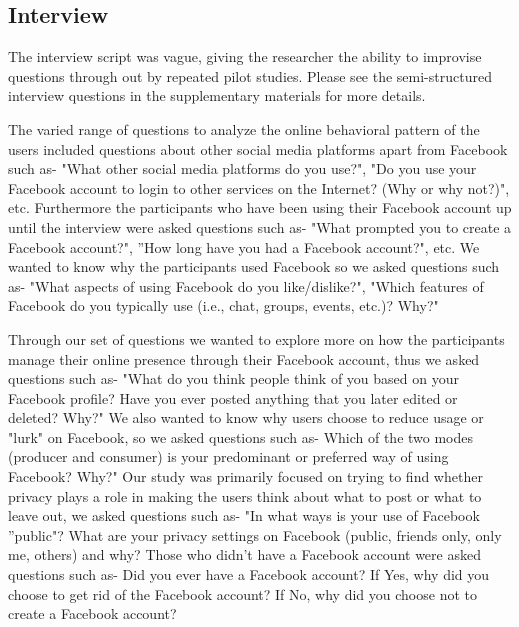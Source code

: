 \subsection{Interview}
The interview script was vague, giving the researcher the ability to improvise questions through out by repeated pilot studies. Please see the semi-structured interview questions in the supplementary materials for more details.

The varied range of questions to analyze the online behavioral pattern of the users included questions about other social media platforms apart from Facebook such as- "What other social media platforms do you use?", "Do you use your Facebook account to login to other services on the Internet? (Why or why not?)", etc. Furthermore the participants who have been using their Facebook account up until the interview were asked questions such as- "What prompted you to create a Facebook account?", ''How long have you had a Facebook account?", etc. We wanted to know why the participants used Facebook so we asked questions such as- "What aspects of using Facebook do you like/dislike?", "Which features of Facebook do you typically use (i.e., chat, groups, events, etc.)? Why?"

Through our set of questions we wanted to explore more on how the participants manage their online presence through their Facebook account, thus we asked questions such as- "What do you think people think of you based on your Facebook profile?
Have you ever posted anything that you later edited or deleted? Why?"
We also wanted to know why users choose to reduce usage or "lurk" on Facebook, so we asked questions such as- 
Which of the two modes (producer and consumer) is your predominant or preferred way of using Facebook? Why?"
Our study was primarily focused on trying to find whether privacy plays a role in making the users think about what to post or what to leave out, we asked questions such as- "In what ways is your use of Facebook ''public"?
What are your privacy settings on Facebook (public, friends only, only me, others) and why?
Those who didn't have a Facebook account were asked questions such as- Did you ever have a Facebook account?
If Yes, why did you choose to get rid of the Facebook account?
If No, why did you choose not to create a Facebook account?

